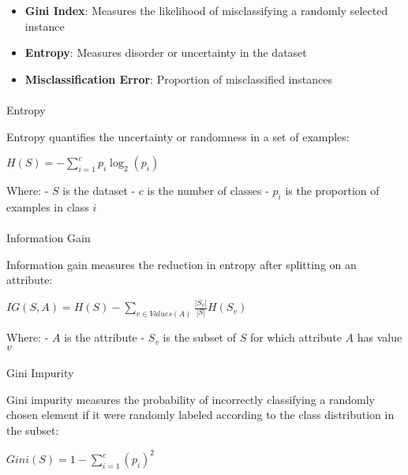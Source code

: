 \documentclass[
  letterpaper,
  DIV=11,
  numbers=noendperiod]{scrreprt}
\makeatletter
\let\oldparagraph\paragraph
\renewcommand{\paragraph}{
    \@ifstar
      \xxxParagraphStar
      \xxxParagraphNoStar
  }
\newcommand{\xxxParagraphStar}[1]{\oldparagraph*{#1}\mbox{}}
\newcommand{\xxxParagraphNoStar}[1]{\oldparagraph{#1}\mbox{}}
\providecommand{\tightlist}{%
  \setlength{\itemsep}{0pt}\setlength{\parskip}{0pt}}\usepackage{longtable,booktabs,array}
\makeatother
\begin{document}
\begin{itemize}
\tightlist
\item
  \textbf{Gini Index}: Measures the likelihood of misclassifying a
  randomly selected instance
\item
  \textbf{Entropy}: Measures disorder or uncertainty in the dataset
\item
  \textbf{Misclassification Error}: Proportion of misclassified
  instances
\end{itemize}

\paragraph{Entropy}\label{entropy}

Entropy quantifies the uncertainty or randomness in a set of examples:

\(H(S) = -\sum_{i=1}^{c} p_i \log_2(p_i)\)

Where: - \(S\) is the dataset - \(c\) is the number of classes - \(p_i\)
is the proportion of examples in class \(i\)

\paragraph{Information Gain}\label{information-gain}

Information gain measures the reduction in entropy after splitting on an
attribute:

\(IG(S, A) = H(S) - \sum_{v \in Values(A)} \frac{|S_v|}{|S|} H(S_v)\)

Where: - \(A\) is the attribute - \(S_v\) is the subset of \(S\) for
which attribute \(A\) has value \(v\)

\paragraph{Gini Impurity}\label{gini-impurity}

Gini impurity measures the probability of incorrectly classifying a
randomly chosen element if it were randomly labeled according to the
class distribution in the subset:

\(Gini(S) = 1 - \sum_{i=1}^{c} (p_i)^2\)
\end{document}

